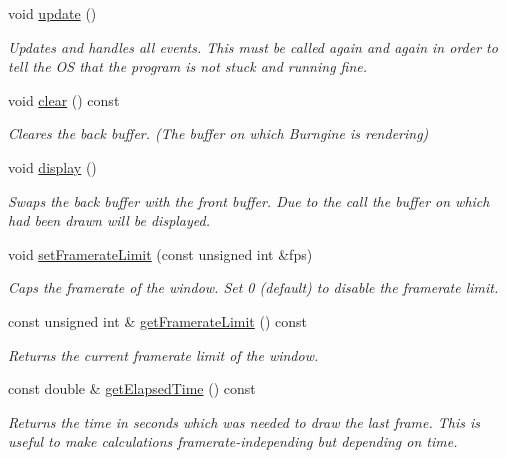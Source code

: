 \begin{DoxyCompactItemize}
void \hyperlink{classburn_1_1_window_a81e1da9f111938b38bc4c2c06dac9cfd}{update} ()
\begin{DoxyCompactList}\small\item\em Updates and handles all events. This must be called again and again in order to tell the O\-S that the program is not stuck and running fine. \end{DoxyCompactList}\item 
void \hyperlink{classburn_1_1_window_a2e6c75cedaeb5571aaac2921bf8bcb6e}{clear} () const 
\begin{DoxyCompactList}\small\item\em Cleares the back buffer. (The buffer on which Burngine is rendering) \end{DoxyCompactList}\item 
void \hyperlink{classburn_1_1_window_a017ddbce346ebe3e11e2abc6ce0948e0}{display} ()
\begin{DoxyCompactList}\small\item\em Swaps the back buffer with the front buffer. Due to the call the buffer on which had been drawn will be displayed. \end{DoxyCompactList}\item 
void \hyperlink{classburn_1_1_window_a840d45e13910496fe9edd45d844e46a1}{set\-Framerate\-Limit} (const unsigned int \&fps)
\begin{DoxyCompactList}\small\item\em Caps the framerate of the window. Set 0 (default) to disable the framerate limit. \end{DoxyCompactList}\item 
const unsigned int \& \hyperlink{classburn_1_1_window_aa694b6ed57c02e625fff074f31a107c9}{get\-Framerate\-Limit} () const 
\begin{DoxyCompactList}\small\item\em Returns the current framerate limit of the window. \end{DoxyCompactList}\item 
const double \& \hyperlink{classburn_1_1_window_ae5af78665f468bd19ebb38a8ac13b701}{get\-Elapsed\-Time} () const 
\begin{DoxyCompactList}\small\item\em Returns the time in seconds which was needed to draw the last frame. This is useful to make calculations framerate-\/independing but depending on time. \end{DoxyCompactList}\end{DoxyCompactItemize}
